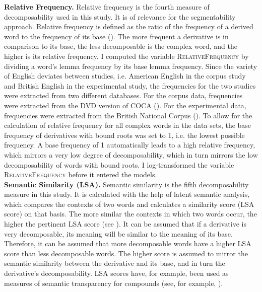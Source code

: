 \textbf{Relative Frequency.} Relative frequency is the fourth measure of decomposability used in this study. It is of relevance for the segmentability approach. Relative frequency is defined as the ratio of the frequency of a derived word to the frequency of its base (\citealt{Hay.2003}). The more frequent a derivative is in comparison to its base, the less decomposable is the complex word, and the higher is its relative frequency. 
I computed the variable \textsc{RelativeFrequency} by dividing a word's lemma frequency by its base lemma frequency. Since the variety of English deviates between studies, i.e. American English in the corpus study and British English in the experimental study, the frequencies for the two studies were extracted from two different databases. For the corpus data, frequencies were extracted from the DVD  version of COCA (\citealt{Davies.20082014}). For the experimental data, frequencies were extracted from the British National Corpus (\citealt{Davies.2004}).
To allow for the calculation of relative frequency for all complex words in the data sets, the base frequency of derivatives with bound roots was set to 1, i.e. the lowest possible frequency. A base frequency of 1 automatically leads to a high relative frequency, which mirrors a very low degree of decomposability, which in turn mirrors the low decomposability of words with bound roots. 
I log-transformed the variable \textsc{RelativeFrequency}  before it entered the models.\\

\textbf{Semantic Similarity (LSA).} Semantic similarity is the fifth decomposability measure in this study. It is calculated with the help of latent semantic analysis, which compares the contexts of two words and calculates a similarity score (LSA score) on that basis. The more similar the contexts in which two words occur, the higher the pertinent  LSA score (see \citealt{Landauer.1998}). It can be assumed that if a derivative is very decomposable, its meaning will be similar to the meaning of its base. Therefore, it can be assumed that more decomposable words have a higher LSA score than  less decomposable words. The higher score is assumed to mirror the semantic similarity between the derivative and its base, and in turn the derivative's decomposability. LSA scores have, for example, been used as measures of semantic transparency for compounds (see, for example, \citealt{Wang.2014, Gagne.2016}).

